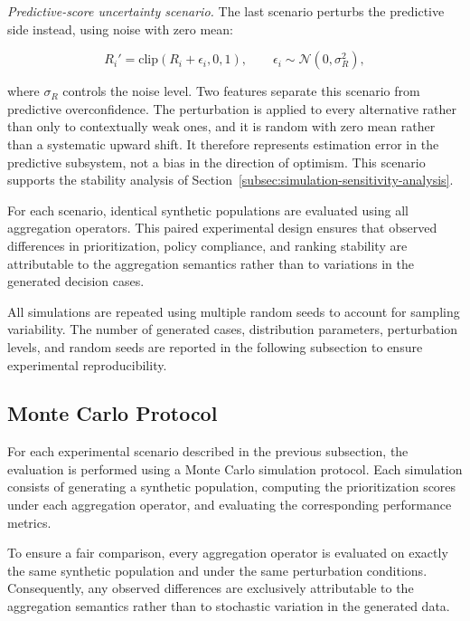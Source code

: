 \documentclass[mathematics,article,submit,moreauthors]{Definitions/mdpi}
\begin{document}
\begin{enumerate}
{\color{teal}\item \textit{Predictive-score uncertainty scenario.}
The last scenario perturbs the predictive side instead, using noise with
zero mean:

\begin{equation}
R_i'=\mathrm{clip}(R_i+\epsilon_i,0,1),
\qquad
\epsilon_i\sim\mathcal{N}(0,\sigma_R^2),
\label{eq:score-uncertainty}
\end{equation}

where $\sigma_R$ controls the noise level. Two features separate this
scenario from predictive overconfidence. The perturbation is applied to
every alternative rather than only to contextually weak ones, and it is
random with zero mean rather than a systematic upward shift. It therefore
represents estimation error in the predictive subsystem, not a bias in the
direction of optimism. This scenario supports the stability analysis of
Section~\ref{subsec:simulation-sensitivity-analysis}.}

\end{enumerate}

For each scenario, identical synthetic populations are evaluated using
all aggregation operators. This paired experimental design ensures that
observed differences in prioritization, policy compliance, and ranking
stability are attributable to the aggregation semantics rather than to
variations in the generated decision cases.

All simulations are repeated using multiple random seeds to account for
sampling variability. The number of generated cases, distribution
parameters, perturbation levels, and random seeds are reported in the
following subsection to ensure experimental reproducibility.

\subsection{Monte Carlo Protocol}
\label{subsec:monte-carlo}
%
%


For each experimental scenario described in the previous subsection, the
evaluation is performed using a Monte Carlo simulation protocol. Each
simulation consists of generating a synthetic population, computing the
prioritization scores under each aggregation operator, and evaluating
the corresponding performance metrics.

To ensure a fair comparison, every aggregation operator is evaluated on
exactly the same synthetic population and under the same perturbation
conditions. Consequently, any observed differences are exclusively
attributable to the aggregation semantics rather than to stochastic
variation in the generated data.
\end{document}

